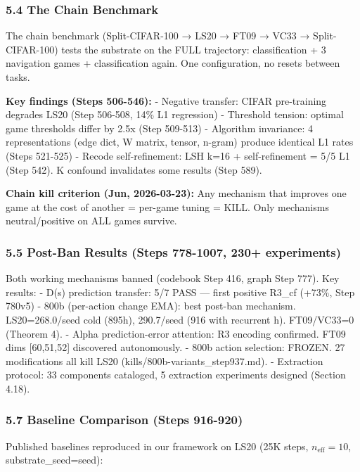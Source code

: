 \documentclass[
  11pt,
]{article}
\begin{document}
\subsubsection{5.4 The Chain Benchmark}\label{the-chain-benchmark}

The chain benchmark (Split-CIFAR-100 → LS20 → FT09 → VC33 →
Split-CIFAR-100) tests the substrate on the FULL trajectory:
classification + 3 navigation games + classification again. One
configuration, no resets between tasks.

\textbf{Key findings (Steps 506-546):} - Negative transfer: CIFAR
pre-training degrades LS20 (Step 506-508, 14\% L1 regression) -
Threshold tension: optimal game thresholds differ by 2.5x (Step 509-513)
- Algorithm invariance: 4 representations (edge dict, W matrix, tensor,
n-gram) produce identical L1 rates (Steps 521-525) - Recode
self-refinement: LSH k=16 + self-refinement = 5/5 L1 (Step 542). K
confound invalidates some results (Step 589).

\textbf{Chain kill criterion (Jun, 2026-03-23):} Any mechanism that
improves one game at the cost of another = per-game tuning = KILL. Only
mechanisms neutral/positive on ALL games survive.

\subsubsection{5.5 Post-Ban Results (Steps 778-1007, 230+
experiments)}\label{post-ban-results-steps-778-1007-230-experiments}

Both working mechanisms banned (codebook Step 416, graph Step 777). Key
results: - D(s) prediction transfer: 5/7 PASS --- first positive R3\_cf
(+73\%, Step 780v5) - 800b (per-action change EMA): best post-ban
mechanism. LS20=268.0/seed cold (895h), 290.7/seed (916 with recurrent
h). FT09/VC33=0 (Theorem 4). - Alpha prediction-error attention: R3
encoding confirmed. FT09 dims {[}60,51,52{]} discovered autonomously. -
800b action selection: FROZEN. 27 modifications all kill LS20
(kills/800b-variants\_step937.md). - Extraction protocol: 33 components
cataloged, 5 extraction experiments designed (Section 4.18).

\subsubsection{5.7 Baseline Comparison (Steps
916-920)}\label{baseline-comparison-steps-916-920}

Published baselines reproduced in our framework on LS20 (25K steps,
\(n_{\text{eff}}=10\), substrate\_seed=seed):
\end{document}
